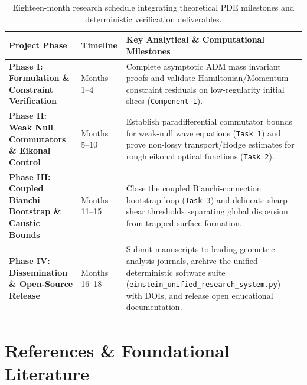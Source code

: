 \documentclass[11pt, a4paper]{article}
\begin{document}
\begin{table}[h!]
\centering
\renewcommand{\arraystretch}{1.35}
\begin{tabularx}{\textwidth}{>{\bfseries}p{4.2cm} p{2.4cm} X}
\toprule
Project Phase & Timeline & Key Analytical \& Computational Milestones \\
\midrule
Phase I: Formulation \& Constraint Verification & Months 1--4 & Complete asymptotic ADM mass invariant proofs and validate Hamiltonian/Momentum constraint residuals on low-regularity initial slices (\texttt{Component 1}). \\
Phase II: Weak Null Commutators \& Eikonal Control & Months 5--10 & Establish paradifferential commutator bounds for weak-null wave equations (\texttt{Task 1}) and prove non-lossy transport/Hodge estimates for rough eikonal optical functions (\texttt{Task 2}). \\
Phase III: Coupled Bianchi Bootstrap \& Caustic Bounds & Months 11--15 & Close the coupled Bianchi-connection bootstrap loop (\texttt{Task 3}) and delineate sharp shear thresholds separating global dispersion from trapped-surface formation. \\
Phase IV: Dissemination \& Open-Source Release & Months 16--18 & Submit manuscripts to leading geometric analysis journals, archive the unified deterministic software suite (\texttt{einstein\_unified\_research\_system.py}) with DOIs, and release open educational documentation. \\
\bottomrule
\end{tabularx}
\caption{Eighteen-month research schedule integrating theoretical PDE milestones and deterministic verification deliverables.}
\end{table}

\section{References \& Foundational Literature}
\end{document}
